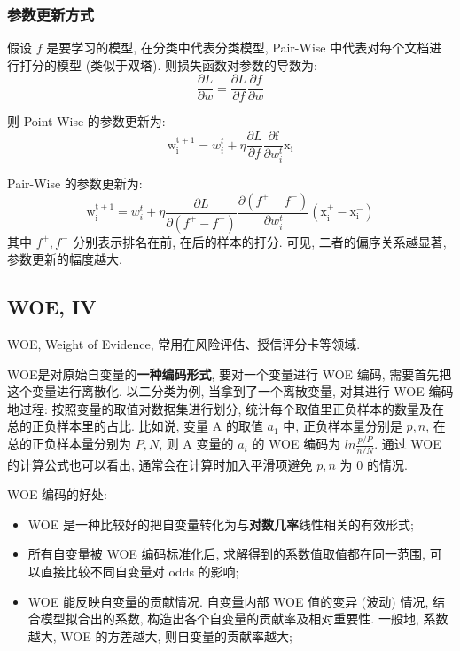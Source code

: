 \subsubsection{参数更新方式}
假设 $f$ 是要学习的模型, 在分类中代表分类模型, Pair-Wise 中代表对每个文档进行打分的模型 (类似于双塔). 则损失函数对参数的导数为:
$$
\frac{\partial L}{\partial w}=\frac{\partial L}{\partial f} \frac{\partial f}{\partial w}
$$

则 Point-Wise 的参数更新为:
$$
\mathrm{w}_{\mathrm{i}}^{\mathrm{t}+1}=w_{i}^{t}+\eta \frac{\partial L}{\partial f} \frac{\partial \mathrm{f}}{\partial w_{i}^{t}} \mathrm{x}_{\mathrm{i}}
$$

Pair-Wise 的参数更新为:
$$
\mathrm{w}_{\mathrm{i}}^{\mathrm{t}+1}=w_{i}^{t}+\eta \frac{\partial L}{\partial\left(f^{+}-f^{-}\right)} \frac{\partial\left(f^{+}-f^{-}\right)}{\partial w_{i}^{t}}\left(\mathrm{x}_{\mathrm{i}}^{+}-\mathrm{x}_{\mathrm{i}}^{-}\right)
$$
其中 $f^+, f^-$ 分别表示排名在前, 在后的样本的打分. 可见, 二者的偏序关系越显著, 参数更新的幅度越大.

\subsection{WOE, IV}
WOE, Weight of Evidence, 常用在风险评估、授信评分卡等领域. 

WOE是对原始自变量的\textbf{一种编码形式}, 要对一个变量进行 WOE 编码, 需要首先把这个变量进行离散化. 以二分类为例, 当拿到了一个离散变量, 对其进行 WOE 编码地过程: 按照变量的取值对数据集进行划分, 统计每个取值里正负样本的数量及在总的正负样本里的占比. 比如说, 变量 A 的取值 $a_1$ 中, 正负样本量分别是 $p, n$, 在总的正负样本量分别为 $P, N$, 则 A 变量的 $a_i$ 的 WOE 编码为 $ln \frac{p / P}{n / N}$. 通过 WOE 的计算公式也可以看出, 通常会在计算时加入平滑项避免 $p, n$ 为 0  的情况.

WOE 编码的好处:
\begin{itemize}
	\item WOE 是一种比较好的把自变量转化为与\textbf{对数几率}线性相关的有效形式;
	
	\item 所有自变量被 WOE 编码标准化后, 求解得到的系数值取值都在同一范围, 可以直接比较不同自变量对 odds 的影响;
	
	\item WOE 能反映自变量的贡献情况. 自变量内部 WOE 值的变异 (波动) 情况, 结合模型拟合出的系数, 构造出各个自变量的贡献率及相对重要性. 一般地, 系数越大, WOE 的方差越大, 则自变量的贡献率越大;
\end{itemize}

